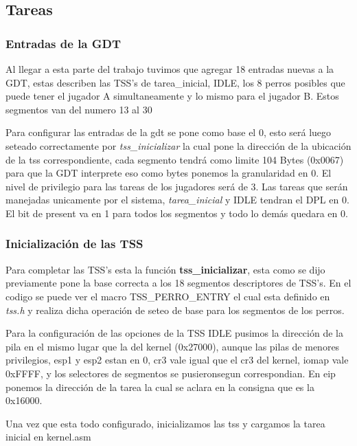 
\subsection{Tareas}

\subsubsection{Entradas de la GDT}

Al llegar a esta parte del trabajo tuvimos que agregar 18 entradas nuevas a la GDT, estas describen las TSS's de tarea\_inicial, IDLE, los 8 perros posibles que puede tener el jugador A simultaneamente y lo mismo para el jugador B. Estos segmentos van del numero 13 al 30

Para configurar las entradas de la gdt se pone como base el 0, esto será luego seteado correctamente por \textit{tss\_inicializar} la cual pone la dirección de la ubicación de la tss correspondiente, cada segmento tendrá como limite 104 Bytes (0x0067) para que la GDT interprete eso como bytes ponemos la granularidad en 0. El nivel de privilegio para las tareas de los jugadores será de 3. Las tareas que serán manejadas unicamente por el sistema, \textit{tarea\_inicial} y IDLE tendran el DPL en 0. El bit de present va en 1 para todos los segmentos y todo lo demás quedara en 0.

\subsubsection{Inicialización de las TSS}
Para completar las TSS's esta la función \textbf{tss\_inicializar}, esta como se dijo previamente pone la base correcta a los 18 segmentos descriptores de TSS's. En el codigo se puede ver el macro TSS\_PERRO\_ENTRY el cual esta definido en \textit{tss.h} y realiza dicha operación de seteo de base para los segmentos de los perros.

Para la configuración de las opciones de la TSS IDLE pusimos la dirección de la pila en el mismo lugar que la del kernel (0x27000), aunque las pilas de menores privilegios, esp1 y esp2 estan en 0, cr3 vale igual que el cr3 del kernel, iomap vale 0xFFFF, y los selectores de segmentos se pusieronsegun correspondian. En eip ponemos la dirección de la tarea la cual se aclara en la consigna que es la 0x16000.

Una vez que esta todo configurado, inicializamos las tss y cargamos la tarea inicial en kernel.asm

